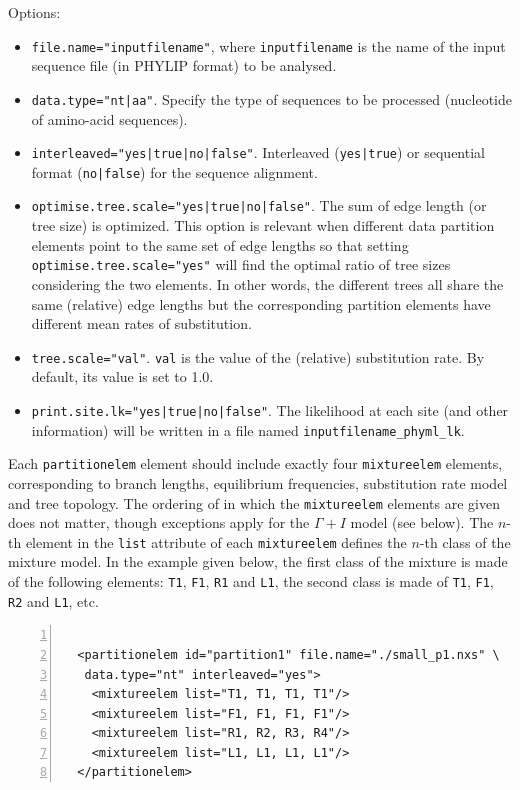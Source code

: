 \documentclass[a4paper,12pt]{article}
\newcommand{\x}[1]{\texttt{#1}}
\begin{document}
Options:
\begin{itemize}
\item \x{file.name="inputfilename"}, where \x{inputfilename} is the name of the input sequence file
  (in PHYLIP format) to be analysed.
\item \x{data.type="nt|aa"}. Specify the type of sequences to be processed (nucleotide of amino-acid sequences).
\item \x{interleaved="yes|true|no|false"}. Interleaved (\x{yes|true}) or sequential format
  (\x{no|false}) for the sequence alignment.
\item \x{optimise.tree.scale="yes|true|no|false"}. The sum of edge length (or tree size) is
  optimized. This option is relevant when different data partition elements point to the same set of
  edge lengths so that setting \x{optimise.tree.scale="yes"} will find the optimal ratio of tree sizes
  considering the two elements. In other words, the different trees all share the same (relative) edge lengths
  but the corresponding partition elements have different mean rates of substitution.
\item \x{tree.scale="val"}. \x{val} is the value of the (relative) substitution rate. By default,
  its value is set to 1.0.
\item \x{print.site.lk="yes|true|no|false"}. The likelihood at each site (and other information)
  will be written in a file named  \x{inputfilename\_phyml\_lk}.
\end{itemize}

Each \x{partitionelem} element should include exactly four \x{mixtureelem} elements, corresponding to
branch lengths, equilibrium frequencies, substitution rate model and tree topology. The ordering of
in which the \x{mixtureelem} elements are given does not matter, though exceptions apply for the
$\Gamma+I$ model (see below). The $n$-th element in the \x{list}
attribute of each \x{mixtureelem} defines the $n$-th class of the mixture model. In the example given
below, the first class of the mixture is made of the following elements: \x{T1}, \x{F1}, \x{R1} and
\x{L1}, the second class is made of \x{T1}, \x{F1}, \x{R2} and \x{L1}, etc.


\vspace{0.2cm}
\begin{Verbatim}[frame=single, label=Example of `partitionelem' component, samepage=true,
  baselinestretch=0.5, fontsize=\small, numbers=left]

  <partitionelem id="partition1" file.name="./small_p1.nxs" \
   data.type="nt" interleaved="yes">
    <mixtureelem list="T1, T1, T1, T1"/>
    <mixtureelem list="F1, F1, F1, F1"/>
    <mixtureelem list="R1, R2, R3, R4"/>
    <mixtureelem list="L1, L1, L1, L1"/>
  </partitionelem>

\end{Verbatim}
\end{document}
